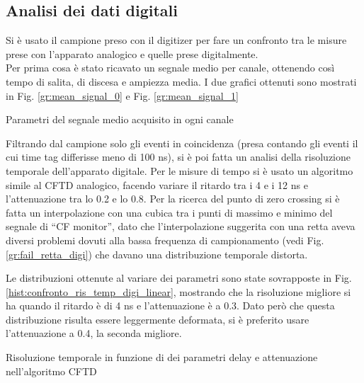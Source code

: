 \subsection{Analisi dei dati digitali}
Si è usato il campione preso con il digitizer per fare un confronto tra le misure prese con l'apparato analogico e quelle prese digitalmente.\\
Per prima cosa è stato ricavato un segnale medio per canale, ottenendo così tempo di salita, di discesa e ampiezza media. I due grafici ottenuti sono mostrati in Fig. \ref{gr:mean_signal_0} e Fig. \ref{gr:mean_signal_1}




\begin{tabella}[h]
	\centering
	
	\caption{Parametri del segnale medio acquisito in ogni canale}
	\label{tab:calibrazione_iniziali_digit}
\end{tabella}

Filtrando dal campione solo gli eventi in coincidenza (presa contando gli eventi il cui time tag differisse meno di 100 ns), si è poi fatta un analisi della risoluzione temporale dell'apparato digitale. Per le misure di tempo si è usato un algoritmo simile al CFTD analogico, facendo variare il ritardo tra i 4 e i 12 ns e l'attenuazione tra lo 0.2 e lo 0.8. Per la ricerca del punto di zero crossing si è fatta un interpolazione con una cubica tra i punti di massimo e minimo del segnale di ``CF monitor'', dato che l'interpolazione suggerita con una retta aveva diversi problemi dovuti alla bassa frequenza di campionamento (vedi Fig. \ref{gr:fail_retta_digi}) che davano una distribuzione temporale distorta.



Le distribuzioni ottenute al variare dei parametri sono state sovrapposte in Fig. \ref{hist:confronto_ris_temp_digi_linear}, mostrando che la risoluzione migliore si ha quando il ritardo è di 4 ns e l'attenuazione è a 0.3. Dato però che questa distribuzione risulta essere leggermente deformata, si è preferito usare l'attenuazione a 0.4, la seconda migliore.



\begin{tabella}[h]
	\centering
	
	\caption{Risoluzione temporale in funzione di dei parametri delay e attenuazione nell'algoritmo CFTD}
	\label{tab:cftd_fwhm_digi}
\end{tabella}

